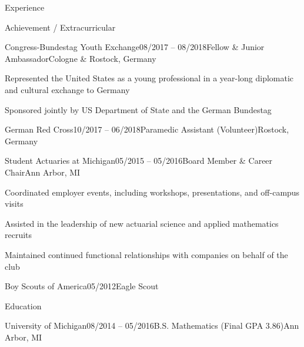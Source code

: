 \documentclass{resume}
\begin{document}
\begin{cvSection}{Experience}
    \end{cvSection}



    \begin{cvSection}{Achievement / Extracurricular}

        \begin{cvSubsection}{Congress-Bundestag Youth Exchange}{08/2017 -- 08/2018}{Fellow \& Junior Ambassador}{Cologne \& Rostock, Germany}
            \item Represented the United States as a young professional in a year-long diplomatic
            and cultural exchange to Germany
            \item Sponsored jointly by US Department of State and the German Bundestag
        \end{cvSubsection}

        \begin{cvSubsection}{German Red Cross}{10/2017 -- 06/2018}{Paramedic Assistant (Volunteer)}{Rostock, Germany}
        \end{cvSubsection}

        \begin{cvSubsection}{Student Actuaries at Michigan}{05/2015 -- 05/2016}{Board Member \& Career Chair}{Ann Arbor, MI}
            \item Coordinated employer events, including workshops, presentations, and off-campus visits
            \item Assisted in the leadership of new actuarial science and applied mathematics recruits
            \item Maintained continued functional relationships with companies on behalf of the club
        \end{cvSubsection}

        \begin{cvSubsection}{Boy Scouts of America}{05/2012}{Eagle Scout}{}
        \end{cvSubsection}

    \end {cvSection}

    \begin{cvSection}{Education}


        \begin{cvSubsection}{University of Michigan}{08/2014 -- 05/2016}{B.S. Mathematics (Final GPA 3.86)}{Ann Arbor, MI}
        \end{cvSubsection}

    \end {cvSection}
\end{document}
